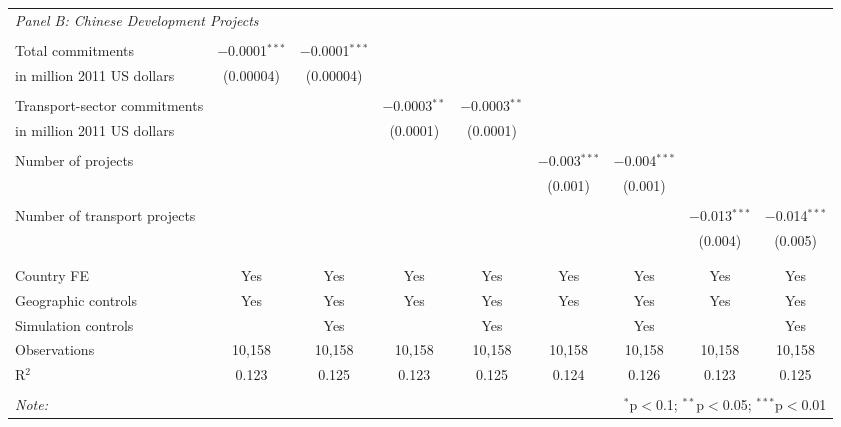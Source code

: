 \documentclass[11pt, oneside]{article}   	%
\begin{document}
\begin{table}[!t]
{\begin{tabular}{@{\extracolsep{5pt}}lcccccccc}
\multicolumn{9}{l}{\textit{Panel B: Chinese Development Projects}} \\
\\[-1.8ex]
Total commitments & $-$0.0001$^{***}$ & $-$0.0001$^{***}$ &  &  &  &  &  &  \\
 \hspace*{3mm} in million 2011 US dollars & (0.00004) & (0.00004) &  &  &  &  &  &  \\
 & & & & & & & & \\
Transport-sector commitments &  &  & $-$0.0003$^{**}$ & $-$0.0003$^{**}$ &  &  &  &  \\
 \hspace*{3mm} in million 2011 US dollars &  &  & (0.0001) & (0.0001) &  &  &  &  \\
 & & & & & & & & \\
Number of projects &  &  &  &  & $-$0.003$^{***}$ & $-$0.004$^{***}$ &  &  \\
 &  &  &  &  & (0.001) & (0.001) &  &  \\
 & & & & & & & & \\
Number of transport projects &  &  &  &  &  &  & $-$0.013$^{***}$ & $-$0.014$^{***}$ \\
 &  &  &  &  &  &  & (0.004) & (0.005) \\
 & & & & & & & & \\
 \\[-1.8ex]
Country FE & Yes & Yes & Yes & Yes & Yes & Yes & Yes & Yes \\
Geographic controls & Yes & Yes & Yes & Yes & Yes & Yes & Yes & Yes \\
Simulation controls &  & Yes &  & Yes &  & Yes &  & Yes \\
Observations & 10,158 & 10,158 & 10,158 & 10,158 & 10,158 & 10,158 & 10,158 & 10,158 \\
R$^{2}$ & 0.123 & 0.125 & 0.123 & 0.125 & 0.124 & 0.126 & 0.123 & 0.125 \\
 \hline
 \hline \\[-1.8ex]
 \textit{Note:}  & \multicolumn{8}{r}{$^{*}$p$<$0.1; $^{**}$p$<$0.05; $^{***}$p$<$0.01} \\
 \end{tabular}


}


\end{table}
\end{document}
